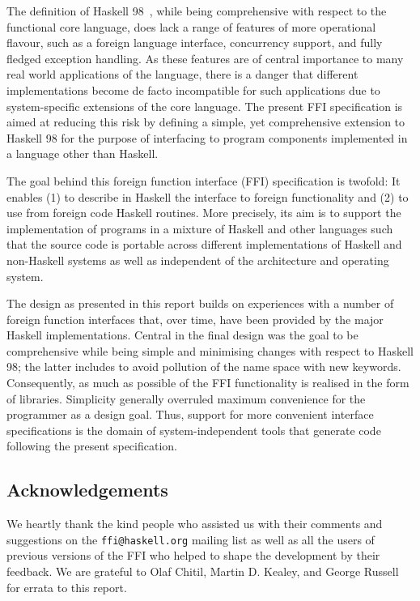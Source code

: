 \documentclass[a4paper,twoside]{article}
\newcommand{\code}[1]{\texttt{#1}}      %
\begin{document}
The definition of Haskell 98~\cite{haskell98}, while being comprehensive with
respect to the functional core language, does lack a range of features of more
operational flavour, such as a foreign language interface, concurrency
support, and fully fledged exception handling.  As these features are of
central importance to many real world applications of the language, there is a
danger that different implementations become de facto incompatible for such
applications due to system-specific extensions of the core language.  The
present FFI specification is aimed at reducing this risk by defining a simple,
yet comprehensive extension to Haskell 98 for the purpose of interfacing to
program components implemented in a language other than Haskell.

The goal behind this foreign function interface (FFI) specification is
twofold: It enables (1) to describe in Haskell the interface to foreign
functionality and (2) to use from foreign code Haskell routines.  More
precisely, its aim is to support the implementation of programs in a mixture
of Haskell and other languages such that the source code is portable across
different implementations of Haskell and non-Haskell systems as well as
independent of the architecture and operating system.

The design as presented in this report builds on experiences with a number of
foreign function interfaces that, over time, have been provided by the major
Haskell implementations.  Central in the final design was the goal to be
comprehensive while being simple and minimising changes with respect to
Haskell 98; the latter includes to avoid pollution of the name space with new
keywords.  Consequently, as much as possible of the FFI functionality is
realised in the form of libraries.  Simplicity generally overruled maximum
convenience for the programmer as a design goal.  Thus, support for more
convenient interface specifications is the domain of system-independent tools
that generate code following the present specification.

\subsection*{Acknowledgements}

We heartly thank the kind people who assisted us with their comments and
suggestions on the \code{ffi@haskell.org} mailing list as well as all the
users of previous versions of the FFI who helped to shape the development by
their feedback.  We are grateful to Olaf Chitil, Martin D. Kealey, and George
Russell for errata to this report.
\end{document}
